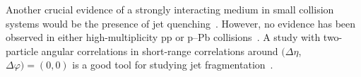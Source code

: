 

Another crucial evidence of a strongly interacting medium in small collision systems would be the presence of jet quenching~\cite{Gyulassy:1990ye,Wang:1991xy}. However, no evidence has been observed in either high-multiplicity pp or p--Pb collisions~\cite{Adam:2014qja,Khachatryan:2016odn,Adam:2016jfp,Adam:2016dau,Acharya:2017okq}. A study with two-particle angular correlations in short-range correlations around $(\Delta\eta$, $\Delta\varphi)=(0,0)$ is a good tool for studying jet fragmentation~\cite{Adam:2016tsv}.


